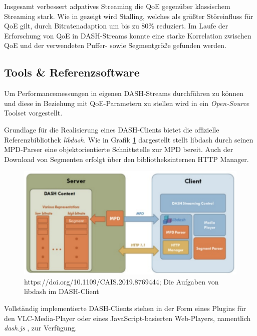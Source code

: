 \documentclass[paper = a4, fontsize = 12pt, parskip = half]{scrartcl} %
\begin{document}
Insgesamt verbessert adpatives Streaming die QoE gegenüber klassischem Streaming stark. Wie in \cite{yao_empirical_2011} gezeigt wird Stalling, welches als größter Störeinfluss für QoE gilt, durch Bitratenadaption um bis zu 80\% reduziert. Im Laufe der Erforschung von QoE in DASH-Streams konnte eine starke Korrelation zwischen QoE und der verwendeten Puffer- sowie Segmentgröße gefunden werden. \cite{seufert_survey_2015}

\subsection{Tools \& Referenzsoftware}
Um Performancemessungen in eigenen DASH-Streams durchführen zu können und diese in Beziehung mit QoE-Parametern zu stellen wird in \cite{lederer_open_2012-1} ein \textit{Open-Source} Toolset vorgestellt. 

Grundlage für die Realisierung eines DASH-Clients bietet die offizielle Referenzbibliothek \textit{libdash}. Wie in Grafik \ref{libdash_embedded} dargestellt stellt libdash durch seinen MPD-Parser eine objektorientierte Schnittstelle zur MPD bereit. Auch der Download von Segmenten erfolgt über den bibliotheksinternen HTTP Manager.

\begin{center}
	\begin{figure}[h]
		\centering
		\includegraphics[width=12cm]{images/libdash_embedded.png}
		\caption{https://doi.org/10.1109/CAIS.2019.8769444; Die Aufgaben von libdash im DASH-Client}
		\label{libdash_embedded}
	\end{figure}
\end{center}

Vollständig implementierte DASH-Clients stehen in der Form eines Plugins für den VLC-Media-Player \cite{muller_vlc_2011} oder eines JavaScript-basierten Web-Players, namentlich \textit{dash.js} \cite{rainer_seamless_2012-1}, zur Verfügung.
\end{document}

